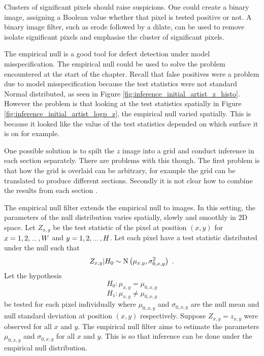 Clusters of significant pixels should raise suspicions. One could create a binary image, assigning a Boolean value whether that pixel is tested positive or not. A binary image filter, such as erode followed by a dilate, can be used to remove isolate significant pixels and emphasise the cluster of significant pixels.

The empirical null is a good tool for defect detection under model misspecification. The empirical null could be used to solve the problem encountered at the start of the chapter. Recall that false positives were a problem due to model misspecification because the test statistics were not standard Normal distributed, as seen in Figure \ref{fig:inference_initial_artist_z_histo}. However the problem is that looking at the test statistics spatially in Figure \ref{fig:inference_initial_artist_logp_z}, the empirical null varied spatially. This is because it looked like the value of the test statistics depended on which surface it is on for example. 

One possible solution is to spilt the $z$ image into a grid and conduct inference in each section separately. There are problems with this though. The first problem is that how the grid is overlaid can be arbitrary, for example the grid can be translated to produce different sections. Secondly it is not clear how to combine the results from each section \citep{efron2008simultaneous}.

The empirical null filter extends the empirical null to images. In this setting, the parameters of the null distribution varies spatially, slowly and smoothly in 2D space. Let $Z_{x,y}$ be the test statistic of the pixel at position $(x,y)$ for $x=1,2,\dotdotdot,W$ and $y=1,2,\dotdotdot,H$. Let each pixel have a test statistic distributed under the null such that
\begin{equation}
  Z_{x,y}|H_0\sim\operatorname{N}\left(
    \mu_{x,y},\sigma_{0,x,y}^2
  \right)
  \ .
\end{equation}
Let the hypothesis
\begin{equation}
  H_0:\mu_{x,y}=\mu_{0,x,y}
\end{equation}
\begin{equation}
  H_1:\mu_{x,y}\neq\mu_{0,x,y}
\end{equation}
be tested for each pixel individually where $\mu_{0,x,y}$ and $\sigma_{0,x,y}$ are the null mean and null standard deviation at position $(x,y)$ respectively. Suppose $Z_{x,y}=z_{x,y}$ were observed for all $x$ and $y$. The empirical null filter aims to estimate the parameters $\mu_{0,x,y}$ and $\sigma_{0,x,y}$ for all $x$ and $y$. This is so that inference can be done under the empirical null distribution. 

